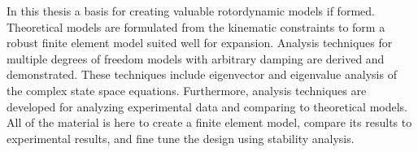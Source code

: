 In this thesis a basis for creating valuable rotordynamic models if formed. Theoretical models are formulated from the kinematic constraints to form a robust finite element model suited well for expansion. Analysis techniques for multiple degrees of freedom models with arbitrary damping are derived and demonstrated. These techniques include eigenvector and eigenvalue analysis of the complex state space equations. Furthermore, analysis techniques are developed for analyzing experimental data and comparing to theoretical models. All of the material is here to create a finite element model, compare its results to experimental results, and fine tune the design using stability analysis.
